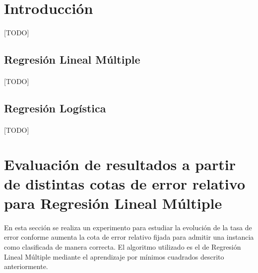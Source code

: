 \documentclass{article}
\begin{document}
	\maketitle %

	\thispagestyle{fancy} %



	\begin{abstract}
		\noindent [TODO ]
	\end{abstract}



	\section{Introducción}
	\label{sec:introducción}

		\paragraph{}
		[TODO]

		\subsection{Regresión Lineal Múltiple}

			\paragraph{}
			[TODO]



		\subsection{Regresión Logística}

			\paragraph{}
			[TODO]




	\section{Evaluación de resultados a partir de distintas cotas de error relativo para Regresión Lineal Múltiple}
	\label{sec:e1}

		\paragraph{}
		En esta sección se realiza un experimento para estudiar la evolución de la tasa de error conforme aumenta la cota de error relativo fijada para admitir una instancia como clasificada de manera correcta. El algoritmo utilizado es el de Regresión Lineal Múltiple mediante el aprendizaje por mínimos cuadrados descrito anteriormente.
\end{document}
